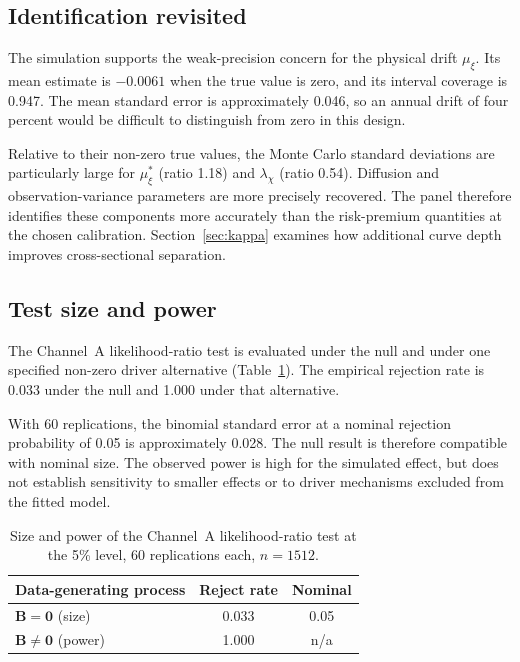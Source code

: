 \documentclass[journal]{IEEEtran}
\begin{document}
\subsection{Identification revisited}
\label{sec:identification2}

The simulation supports the weak-precision concern for the physical drift $\mu_\xi$. Its mean estimate is $-0.0061$ when the true value is zero, and its interval coverage is 0.947. The mean standard error is approximately 0.046, so an annual drift of four percent would be difficult to distinguish from zero in this design.

Relative to their non-zero true values, the Monte Carlo standard deviations are particularly large for $\mu_\xi^{*}$ (ratio 1.18) and $\lambda_\chi$ (ratio 0.54). Diffusion and observation-variance parameters are more precisely recovered. The panel therefore identifies these components more accurately than the risk-premium quantities at the chosen calibration. Section~\ref{sec:kappa} examines how additional curve depth improves cross-sectional separation.

\subsection{Test size and power}
\label{sec:sizepower}

The Channel~A likelihood-ratio test is evaluated under the null and under one specified non-zero driver alternative (Table~\ref{tab:sizepower}). The empirical rejection rate is 0.033 under the null and 1.000 under that alternative.

With 60 replications, the binomial standard error at a nominal rejection probability of 0.05 is approximately 0.028. The null result is therefore compatible with nominal size. The observed power is high for the simulated effect, but does not establish sensitivity to smaller effects or to driver mechanisms excluded from the fitted model.
\begin{table}[H]
\centering
\caption{Size and power of the Channel~A likelihood-ratio test at the 5\% level, 60 replications each, $n = 1512$.}
\label{tab:sizepower}
\small
\renewcommand{\arraystretch}{1.2}
\begin{tabular}{@{}lcc@{}}
\toprule
\textbf{Data-generating process} & \textbf{Reject rate} & \textbf{Nominal} \\
\midrule
$\bm{B} = \bm{0}$ (size)     & 0.033 & 0.05 \\
$\bm{B} \neq \bm{0}$ (power) & 1.000 & n/a \\
\bottomrule
\end{tabular}
\end{table}
\end{document}
